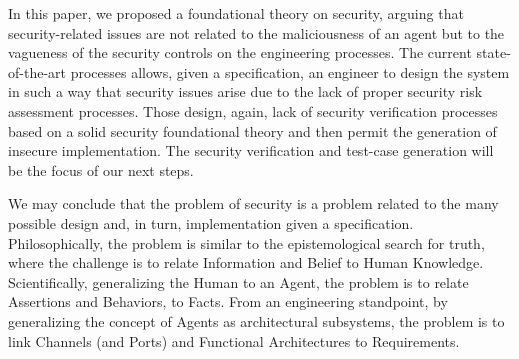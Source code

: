 In this paper, we proposed a foundational theory on security, arguing that
security-related issues are not related to the maliciousness of an agent but to
the vagueness of the security controls on the engineering processes.
The current state-of-the-art processes allows, given a specification,
an engineer to design the system in such a way that security issues arise due to the lack
of proper security risk assessment processes.
Those design, again, lack of security verification processes based on a solid 
security foundational theory and then permit the generation of insecure implementation.
The security verification and test-case generation will be the focus of our next steps.

We may conclude that the problem of security is a problem related to the 
many possible design and, in turn, implementation given a specification.
Philosophically, the problem is similar to the epistemological search for truth,
where the challenge is to relate Information and Belief to Human Knowledge.
Scientifically, generalizing the Human to an Agent, the problem is
to relate Assertions and Behaviors, to Facts. From an engineering standpoint,
by generalizing the concept of Agents as architectural subsystems, the
problem is to link Channels (and Ports) and Functional Architectures to 
Requirements.
